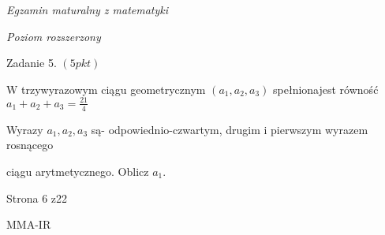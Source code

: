 \documentclass[a4paper,12pt]{article}
\begin{document}
{\it Egzamin maturalny z matematyki}

{\it Poziom rozszerzony}

Zadanie 5. $(5pkt)$

$\mathrm{W}$ trzywyrazowym ciągu geometrycznym $(a_{1},a_{2},a_{3})$ spełnionajest równość $a_{1}+a_{2}+a_{3}=\displaystyle \frac{21}{4}$

Wyrazy $a_{1}, a_{2}, a_{3}$ są- odpowiednio-czwartym, drugim i pierwszym wyrazem rosnącego

ciągu arytmetycznego. Oblicz $a_{1}.$

Strona 6 z22

MMA-IR
\end{document}
